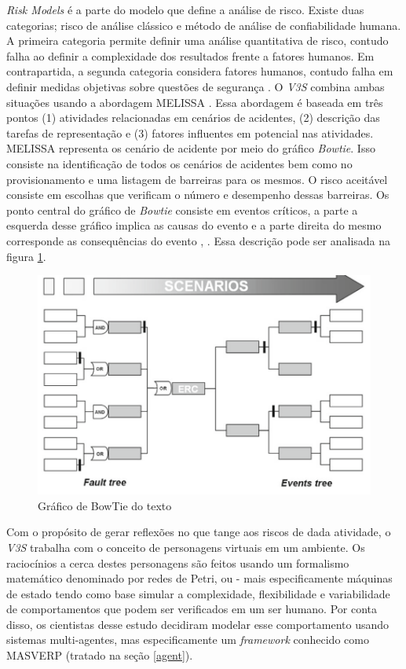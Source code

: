 \textit{Risk Models} é a parte do modelo que define a análise de risco. Existe duas categorias; risco de análise clássico e método de análise de confiabilidade humana. A primeira categoria permite definir uma análise quantitativa de risco, contudo falha ao definir a complexidade dos resultados frente a fatores humanos. Em contrapartida, a segunda categoria considera fatores humanos, contudo falha em definir medidas objetivas sobre questões de segurança \cite{v3sframework}. O \textit{V3S} combina ambas situações usando a abordagem MELISSA \cite{melissaproject} \cite{v3sframework}. Essa abordagem é baseada em três pontos (1) atividades relacionadas em cenários de acidentes, (2) descrição das tarefas de representação e (3) fatores influentes em potencial nas atividades. MELISSA representa os cenário de acidente por meio do gráfico \textit{Bowtie}. Isso consiste na identificação de todos os cenários de acidentes bem como no provisionamento e uma listagem de barreiras para os mesmos. O risco aceitável consiste em escolhas que verificam o número e desempenho dessas barreiras. Os ponto central do gráfico de \textit{Bowtie} consiste em eventos críticos, a parte a esquerda desse gráfico implica as causas do evento e a parte direita do mesmo corresponde as consequências do evento \cite{v3sframework}, \cite{melissaproject}. Essa descrição pode ser analisada na figura \ref{bowtiegraf}. 


\begin{figure}[H]
  \centering
  \includegraphics[width=0.5\linewidth]{figure/bowtie.png} 
  \caption{Gráfico de BowTie do texto \cite{melissaproject}}
  \label{bowtiegraf}
\end{figure}


Com o propósito de gerar reflexões no que tange aos riscos de dada atividade, o \textit{V3S} trabalha com o conceito de personagens virtuais em um ambiente. Os raciocínios a cerca destes personagens são feitos usando um formalismo matemático denominado por redes de Petri, ou - mais especificamente máquinas de estado \cite{v3sframework} tendo como base simular a complexidade, flexibilidade e variabilidade de comportamentos que podem ser verificados em um ser humano. Por conta disso, os cientistas desse estudo decidiram modelar esse comportamento usando sistemas multi-agentes, mas especificamente um \textit{framework} conhecido como MASVERP (tratado na seção \ref{agent}).

